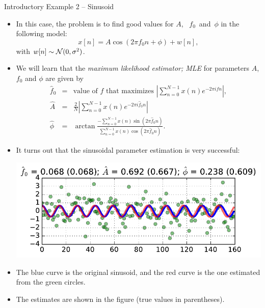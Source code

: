 \documentclass[10pt, aspectratio=169]{beamer} %
\begin{document}
\begin{frame}[allowframebreaks=0.8]{Introductory Example 2 -- Sinusoid}
 \begin{itemize}
\item In this case, the problem is to find good values for $A$,~%
$f_0$~and~$\phi$ in the following model:
\[
x[n] = A\cos(2\pi f_0 n + \phi) + w[n],
\]
with $w[n]\sim {\cal N}(0,\sigma^2)$.

\item We will learn that the \emph{maximum likelihood estimator; MLE}
for parameters $A$, $f_0$ and $\phi$ are given by
\begin{eqnarray*}
\hat{f}_0 &=& \text{value of } f \text{ that maximizes } \left|\sum_{n=0}^{N-1} x(n)e^{-2\pi i f n}\right|,\\
\hat{A} &=& \frac2N \left|\sum_{n=0}^{N-1} x(n)e^{-2\pi i \hat{f}_0 n}\right| \\
\hat{\phi} &=& \arctan \frac{-\sum_{n=0}^{N-1} x(n)\sin(2\pi \hat{f}_0 n)}{\sum_{n=0}^{N-1} x(n)\cos(2\pi \hat{f}_0 n)}.
\end{eqnarray*}

\item It turns out that the sinusoidal parameter estimation is very
successful:
\centerline{\includegraphics[width=\imagewidth]{MLSinusoid.pdf}}
\item The blue curve is the original sinusoid, and the red curve is the one estimated
from the green circles.
\item The estimates are shown in the figure (true values in parentheses).
\end{itemize}
\end{frame}
\end{document}
